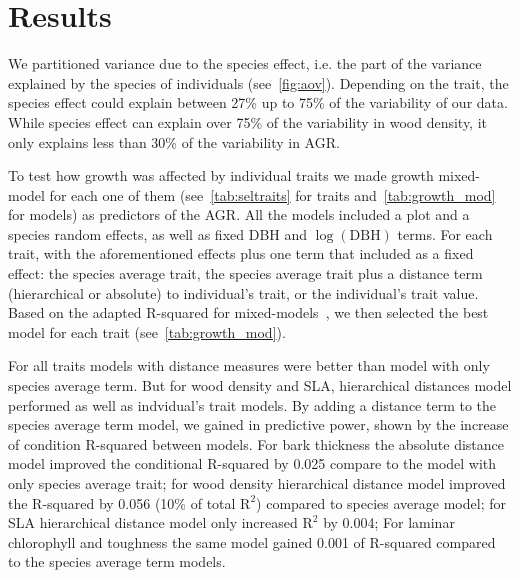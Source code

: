 \label{sec:Res}
\section*{Results}

We partitioned variance due to the species effect, i.e. the part of the variance explained by the species of individuals (see~\autoref{fig:aov}). Depending on the trait, the species effect could explain between 27\% up to 75\% of the variability of our data. While species effect can explain over 75\% of the variability in wood density, it only explains less than 30\% of the variability in AGR.


To test how growth was affected by individual traits we made growth mixed-model for each one of them (see~\autoref{tab:seltraits} for traits and~\autoref{tab:growth_mod} for models) as predictors of the AGR. All the models included a plot and a species random effects, as well as fixed DBH and $\log(\text{DBH})$ terms. For each trait, with the aforementioned effects plus one term that included as a fixed effect: the species average trait, the species average trait plus a distance term (hierarchical or absolute) to individual's trait, or the individual's trait value. Based on the adapted R-squared for mixed-models~\citep{nakagawa_general_2013}, we then selected the best model for each trait (see~\autoref{tab:growth_mod}).

For all traits models with distance measures were better than model with only species average term. But for wood density and SLA, hierarchical distances model performed as well as indvidual's trait models. By adding a distance term to the species average term model, we gained in predictive power, shown by the increase of condition R-squared between models. For bark thickness the absolute distance model improved the conditional R-squared by 0.025 compare to the model with only species average trait; for wood density hierarchical distance model improved the R-squared by 0.056 (10\% of total $\text{R}^2$) compared to species average model; for SLA hierarchical distance model only increased $\text{R}^2$ by 0.004; For laminar chlorophyll and toughness the same model gained 0.001 of R-squared compared to the species average term models.

